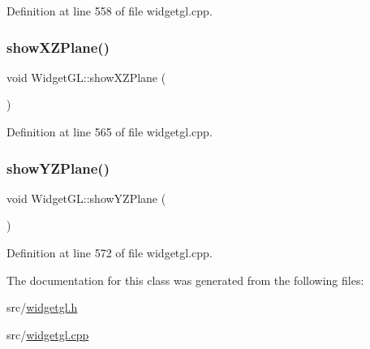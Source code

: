 Definition at line 558 of file widgetgl.\+cpp.

\mbox{\label{class_widget_g_l_a8b74ff35385c0039ee583002ae63fc67}} 
\subsubsection{\texorpdfstring{showXZPlane()}{showXZPlane()}}
{\footnotesize\ttfamily void Widget\+G\+L\+::show\+X\+Z\+Plane (\begin{DoxyParamCaption}{ }\end{DoxyParamCaption})}



Definition at line 565 of file widgetgl.\+cpp.

\mbox{\label{class_widget_g_l_a0cf553ca91fd82d6b98e4bd2ee60c329}} 
\subsubsection{\texorpdfstring{showYZPlane()}{showYZPlane()}}
{\footnotesize\ttfamily void Widget\+G\+L\+::show\+Y\+Z\+Plane (\begin{DoxyParamCaption}{ }\end{DoxyParamCaption})}



Definition at line 572 of file widgetgl.\+cpp.



The documentation for this class was generated from the following files\+:\begin{DoxyCompactItemize}
\item 
src/\mbox{\hyperlink{widgetgl_8h}{widgetgl.\+h}}\item 
src/\mbox{\hyperlink{widgetgl_8cpp}{widgetgl.\+cpp}}\end{DoxyCompactItemize}
